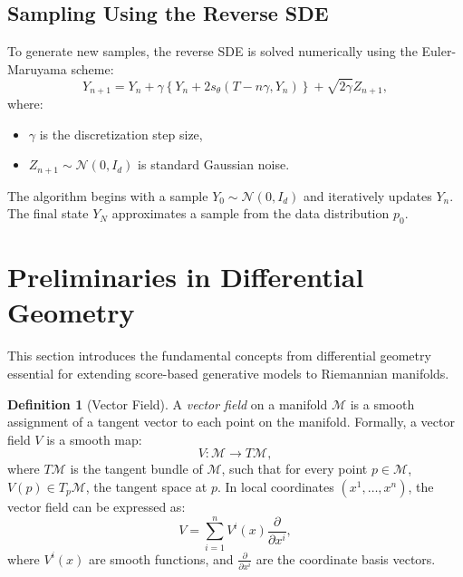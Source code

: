 \documentclass[a4paper,14pt]{article}
\theoremstyle{plain} %
\theoremstyle{definition} %
\theoremstyle{remark} %
\theoremstyle{definition}
\newtheorem{definition}{Definition}[section]
\theoremstyle{remark}
\theoremstyle{remark}
\begin{document}
	\subsection{Sampling Using the Reverse SDE}
	
	To generate new samples, the reverse SDE is solved numerically using the Euler-Maruyama scheme:
	\[
	Y_{n+1} = Y_n + \gamma \left\{ Y_n + 2 s_\theta(T - n\gamma, Y_n) \right\} + \sqrt{2 \gamma} Z_{n+1},
	\]
	where:
	\begin{itemize}
		\item \( \gamma \) is the discretization step size,
		\item \( Z_{n+1} \sim \mathcal{N}(0, I_d) \) is standard Gaussian noise.
	\end{itemize}
	
	The algorithm begins with a sample \( Y_0 \sim \mathcal{N}(0, I_d) \) and iteratively updates \( Y_n \). The final state \( Y_N \) approximates a sample from the data distribution \( p_0 \).
	
	\section{Preliminaries in Differential Geometry}
	
	This section introduces the fundamental concepts from differential geometry essential for extending score-based generative models to Riemannian manifolds.
	
	\begin{definition}[Vector Field]
		A \textit{vector field} on a manifold \( \mathcal{M} \) is a smooth assignment of a tangent vector to each point on the manifold. Formally, a vector field \( V \) is a smooth map:
		\[
		V: \mathcal{M} \to T\mathcal{M},
		\]
		where \( T\mathcal{M} \) is the tangent bundle of \( \mathcal{M} \), such that for every point \( p \in \mathcal{M} \), \( V(p) \in T_p\mathcal{M} \), the tangent space at \( p \). In local coordinates \( (x^1, \dots, x^n) \), the vector field can be expressed as:
		\[
		V = \sum_{i=1}^n V^i(x) \frac{\partial}{\partial x^i},
		\]
		where \( V^i(x) \) are smooth functions, and \( \frac{\partial}{\partial x^i} \) are the coordinate basis vectors.
	\end{definition}
	
\end{document}
